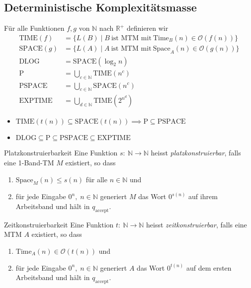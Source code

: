 \documentclass[a4paper,10pt]{article}
\begin{document}
\subsection{Deterministische Komplexitätsmasse}
Für alle Funktionen $f, g$ von $\mathbb{N}$ nach $\mathbb{R}^+$ definieren wir
\begin{align*}
    \textrm{TIME}(f) &= \{L(B) \;|\; B\ \text{ist MTM mit}\ \textrm{Time}_B(n) \in \mathcal{O}(f(n))\}\\
    \textrm{SPACE}(g) &= \{L(A) \;|\; A\ \text{ist MTM mit}\ \textrm{Space}_A(n) \in \mathcal{O}(g(n))\}\\
    \textrm{DLOG} &= \textrm{SPACE}(\log_2 n)\\
    \textrm{P} &= \bigcup_{c \in \mathbb{N}} \textrm{TIME}(n^c)\\
    \textrm{PSPACE} &= \bigcup_{c \in \mathbb{N}} \textrm{SPACE}(n^c)\\
    \textrm{EXPTIME} &= \bigcup_{d \in \mathbb{N}} \textrm{TIME}(2^{n^d})
\end{align*}
\begin{itemize}
    \item $\textrm{TIME}(t(n)) \subseteq \textrm{SPACE}(t(n)) \implies \textrm{P} \subseteq \textrm{PSPACE}$
    \item $\textrm{DLOG} \subseteq \textrm{P} \subseteq \textrm{PSPACE} \subseteq \textrm{EXPTIME}$
\end{itemize}
\begin{subbox}{Platzkonstruierbarkeit}
    Eine Funktion $s:\: \mathbb{N} \to \mathbb{N}$ heisst \emph{platzkonstruierbar}, falls eine 1-Band-TM $M$ existiert, so dass
    \begin{enumerate}
        \item $\textrm{Space}_M(n) \leq s(n)$ für alle $n \in \mathbb{N}$ und
        \item für jede Eingabe $0^n,\; n \in \mathbb{N}$ generiert $M$ das Wort $0^{s(n)}$ auf ihrem Arbeitsband und hält in $q_\textrm{accept}$.
    \end{enumerate}
\end{subbox}
\begin{subbox}{Zeitkonstruierbarkeit}
    Eine Funktion $t:\: \mathbb{N} \to \mathbb{N}$ heisst \emph{zeitkonstruierbar}, falls eine MTM $A$ existiert, so dass
    \begin{enumerate}
        \item $\textrm{Time}_A(n) \in \mathcal{O}(t(n))$ und
        \item für jede Eingabe $0^n,\; n \in \mathbb{N}$ generiert $A$ das Wort $0^{t(n)}$ auf dem ersten Arbeitsband und hält in $q_\textrm{accept}$.
    \end{enumerate}
\end{subbox}
\end{document}
